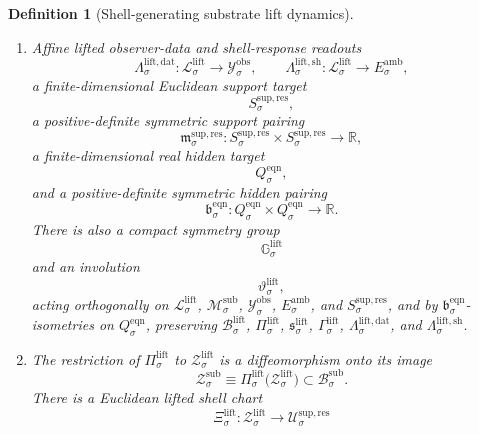\documentclass[11pt]{article}
\newcommand{\DataSpace}[1]{\mathcal Y_{#1}^{\mathrm{obs}}}
\newcommand{\AmbientTarget}[1]{E_{#1}^{\mathrm{amb}}}
\newcommand{\EqnTarget}[1]{Q_{#1}^{\mathrm{eqn}}}
\newcommand{\EqnPair}[1]{\mathfrak b_{#1}^{\mathrm{eqn}}}
\newcommand{\ResSpace}[1]{\mathcal U_{#1}^{\mathrm{sup,res}}}
\newcommand{\ResTarget}[1]{S_{#1}^{\mathrm{sup,res}}}
\newcommand{\ResPair}[1]{\mathfrak m_{#1}^{\mathrm{sup,res}}}
\newcommand{\SubSpace}[1]{\mathcal M_{#1}^{\mathrm{sub}}}
\newcommand{\SubBody}[1]{\mathcal B_{#1}^{\mathrm{sub}}}
\newcommand{\SubShellSet}[1]{\mathcal Z_{#1}^{\mathrm{sub}}}
\newcommand{\LiftSpace}[1]{\mathcal L_{#1}^{\mathrm{lift}}}
\newcommand{\LiftBody}[1]{\mathcal B_{#1}^{\mathrm{lift}}}
\newcommand{\LiftProj}[1]{\Pi_{#1}^{\mathrm{lift}}}
\newcommand{\LiftSelect}[1]{\mathfrak s_{#1}^{\mathrm{lift}}}
\newcommand{\LiftSection}[1]{\Gamma_{#1}^{\mathrm{lift}}}
\newcommand{\LiftFunctional}[1]{\mathscr V_{#1}^{\mathrm{lift}}}
\newcommand{\LiftData}[1]{\Lambda_{#1}^{\mathrm{lift,dat}}}
\newcommand{\LiftShellMap}[1]{\Lambda_{#1}^{\mathrm{lift,sh}}}
\newcommand{\LiftSym}[1]{\mathbb G_{#1}^{\mathrm{lift}}}
\newcommand{\LiftTime}[1]{\vartheta_{#1}^{\mathrm{lift}}}
\newcommand{\LiftShellSet}[1]{\mathcal Z_{#1}^{\mathrm{lift}}}
\newcommand{\LiftChart}[1]{\Xi_{#1}^{\mathrm{lift}}}
\newtheorem{definition}{Definition}
\begin{document}
\begin{definition}[Shell-generating substrate lift dynamics]
\begin{enumerate}
\[    \]
    and that there exists \(\mu_{\sigma}^{\mathrm{fib}}>0\) such that
    \begin{equation}
    \LiftFunctional{\sigma}(\ell)
    \ge
    \LiftFunctional{\sigma}\bigl(\LiftSelect{\sigma}(m)\bigr)
    +
    \mu_{\sigma}^{\mathrm{fib}}\,
    \operatorname{dist}\bigl(\ell,\LiftSelect{\sigma}(m)\bigr)^{2}
    \label{eq:fibergap}
    \end{equation}
    for every \(m\in\SubBody{\sigma}\) and every \(\ell\in\bigl(\LiftProj{\sigma}\bigr)^{-1}(m)\cap\LiftBody{\sigma}\). Assume there exists \(\mu_{\sigma}^{\mathrm{sub}}>0\) such that
    \begin{equation}
    \LiftFunctional{\sigma}\bigl(\LiftSelect{\sigma}(m)\bigr)
    \ge
    \mu_{\sigma}^{\mathrm{sub}}\,
    \operatorname{dist}\bigl(m,\LiftProj{\sigma}(\LiftShellSet{\sigma})\bigr)^{2}
    \qquad
    \text{for all }m\in\SubBody{\sigma}.
    \label{eq:projectedgap}
    \end{equation}
    \item Affine lifted observer-data and shell-response readouts
    \[
    \LiftData{\sigma}:\LiftSpace{\sigma}\to\DataSpace{\sigma},
    \qquad
    \LiftShellMap{\sigma}:\LiftSpace{\sigma}\to\AmbientTarget{\sigma},
    \]
    a finite-dimensional Euclidean support target
    \[
    \ResTarget{\sigma},
    \]
    a positive-definite symmetric support pairing
    \[
    \ResPair{\sigma}:
    \ResTarget{\sigma}\times\ResTarget{\sigma}\to\mathbb R,
    \]
    a finite-dimensional real hidden target
    \[
    \EqnTarget{\sigma},
    \]
    and a positive-definite symmetric hidden pairing
    \[
    \EqnPair{\sigma}:
    \EqnTarget{\sigma}\times\EqnTarget{\sigma}\to\mathbb R.
    \]
    There is also a compact symmetry group
    \[
    \LiftSym{\sigma}
    \]
    and an involution
    \[
    \LiftTime{\sigma},
    \]
    acting orthogonally on \(\LiftSpace{\sigma}\), \(\SubSpace{\sigma}\), \(\DataSpace{\sigma}\), \(\AmbientTarget{\sigma}\), and \(\ResTarget{\sigma}\), and by \(\EqnPair{\sigma}\)-isometries on \(\EqnTarget{\sigma}\), preserving \(\LiftBody{\sigma}\), \(\LiftProj{\sigma}\), \(\LiftSelect{\sigma}\), \(\LiftSection{\sigma}\), \(\LiftData{\sigma}\), and \(\LiftShellMap{\sigma}\).
    \item The restriction of \(\LiftProj{\sigma}\) to \(\LiftShellSet{\sigma}\) is a diffeomorphism onto its image
    \[
    \SubShellSet{\sigma}
    \equiv
    \LiftProj{\sigma}\bigl(\LiftShellSet{\sigma}\bigr)
    \subset \SubBody{\sigma}.
    \]
    There is a Euclidean lifted shell chart
    \[
    \LiftChart{\sigma}:\LiftShellSet{\sigma}\to\ResSpace{\sigma}
\]
\end{enumerate}
\end{definition}
\end{document}
